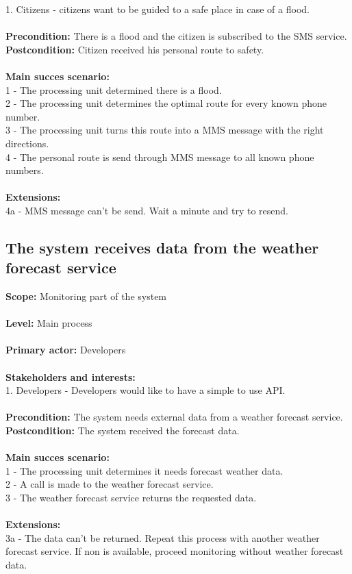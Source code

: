 	1. Citizens - citizens want to be guided to a safe place in case of a flood. \\\\
\textbf{Precondition:} There is a flood and the citizen is subscribed to the SMS service. \\
\textbf{Postcondition:} Citizen received his personal route to safety. \\\\
\textbf{Main succes scenario:} \\
1 - The processing unit determined there is a flood.\\
2 - The processing unit determines the optimal route for every known phone number.\\
3 - The processing unit turns this route into a MMS message with the right directions.\\
4 - The personal route is send through MMS message to all known phone numbers.\\\\
\textbf{Extensions:} \\
4a - MMS message can't be send. Wait a minute and try to resend.\\

\subsection{The system receives data from the weather forecast service}
\textbf{Scope:} Monitoring part of the system\\\\
\textbf{Level:} Main process\\\\
\textbf{Primary actor:} Developers\\\\
\textbf{Stakeholders and interests:}\\
	1. Developers - Developers would like to have a simple to use API.\\\\
\textbf{Precondition:} The system needs external data from a weather forecast service.\\
\textbf{Postcondition:} The system received the forecast data.\\\\
\textbf{Main succes scenario:} \\
1 - The processing unit determines it needs forecast weather data.\\
2 - A call is made to the weather forecast service.\\
3 - The weather forecast service returns the requested data.\\\\
\textbf{Extensions:} \\
3a - The data can't be returned. Repeat this process with another weather forecast service. If non is available, proceed monitoring without weather forecast data.\\

